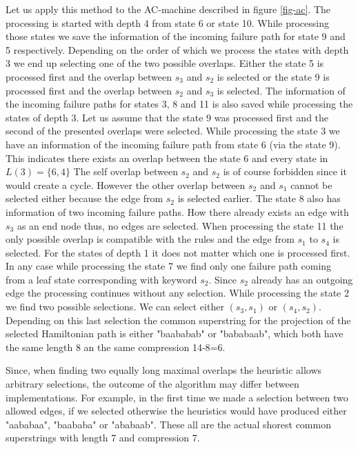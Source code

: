 \documentclass[english,twoside,censored,csm,algorithms-track-2020]{HYthesisML}
\theoremstyle{plain}
\theoremstyle{definition}
\begin{document}
Let us apply this method to the AC-machine described in figure \ref{fig-ac}. The processing is started
with depth 4 from state 6 or state 10. While processing those states we save the information of
the incoming failure path for state 9 and 5 respectively. Depending on the order of which we process
the states with depth 3 we end up selecting one of the two possible overlaps. Either the state 5
is processed first and the overlap between $s_3$ and $s_2$ is selected or the state 9 is processed
first and the overlap between $s_2$ and $s_3$ is selected. The information of the incoming failure
paths for states 3, 8 and 11 is also saved while processing the states of depth 3. Let us assume
that the state 9 was processed first and the second of the presented overlaps were selected.
While processing the state 3 we have an information of the incoming failure path from state 6 (via the
state 9). This indicates there exists an overlap between the state 6 and every state
in $L(3)=\{6,4\}$ The self overlap between $s_2$ and $s_2$ is of course forbidden since it would
create a cycle. However the other overlap between $s_2$ and $s_1$ cannot be selected either because
the edge from $s_2$ is selected earlier. The state 8 also has information of two incoming failure
paths. How there already exists an edge with $s_3$ as an end node thus, no edges are selected.
When processing the state 11 the only possible overlap is compatible with the rules and the edge
from $s_1$ to $s_4$ is selected. For the states of depth 1 it does not matter which one is processed
first. In any case while processing the state 7 we find only one failure path coming from a leaf state
corresponding with keyword $s_2$. Since $s_2$ already has an outgoing edge the processing continues
without any selection. While processing the state 2 we find two possible selections. We can select
either $(s_3,s_1)$ or $(s_4,s_2)$. Depending on this last selection the common superstring for
the projection of the selected Hamiltonian path is either "baababab" or "bababaab", which
both have the same length 8 an the same compression 14-8=6.

Since, when finding two equally long maximal overlaps the heuristic allows arbitrary selections,
the outcome of the algorithm may differ between implementations. For example, in the first time
we made a selection between two allowed edges, if we selected otherwise the heuristics would
have produced either "aababaa", "baababa" or "ababaab". These all are the actual shorest common
superstrings with length 7 and compression 7.
\end{document}
